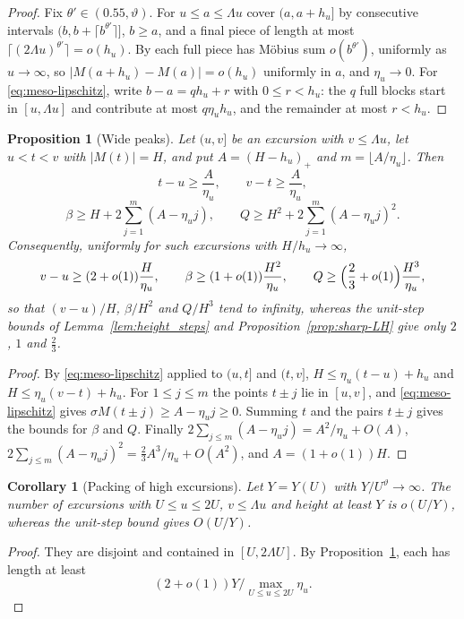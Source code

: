 \documentclass[11pt]{amsart}
\numberwithin{equation}{section}
\theoremstyle{plain}
\newtheorem{proposition}[theorem]{Proposition}
\newtheorem{corollary}[theorem]{Corollary}
\theoremstyle{definition}
\theoremstyle{remark}
\begin{document}
\begin{proof}
Fix $\theta'\in(0.55,\vartheta)$. For $u\le a\le\Lambda u$ cover $(a,a+h_u]$
by consecutive intervals $(b,b+\lceil b^{\theta'}\rceil]$, $b\ge a$, and a
final piece of length at most $\lceil(2\Lambda u)^{\theta'}\rceil=o(h_u)$.
By \cite{MatomakiTeravainen2023} each full piece has Möbius sum
$o(b^{\theta'})$, uniformly as $u\to\infty$, so
$|M(a+h_u)-M(a)|=o(h_u)$ uniformly in $a$, and $\eta_u\to0$. For
\eqref{eq:meso-lipschitz}, write $b-a=qh_u+r$ with $0\le r<h_u$: the $q$
full blocks start in $[u,\Lambda u]$ and contribute at most $q\eta_uh_u$,
and the remainder at most $r<h_u$.
\end{proof}

\begin{proposition}[Wide peaks]
\label{prop:wide-peaks}
Let $(u,v]$ be an excursion with $v\le\Lambda u$, let $u<t<v$ with
$|M(t)|=H$, and put $A=(H-h_u)_+$ and $m=\lfloor A/\eta_u\rfloor$. Then
\[
t-u\ge\frac A{\eta_u},\qquad v-t\ge\frac A{\eta_u},
\]
\[
\beta\ge H+2\sum_{j=1}^m(A-\eta_uj),\qquad
Q\ge H^2+2\sum_{j=1}^m(A-\eta_uj)^2 .
\]
Consequently, uniformly for such excursions with $H/h_u\to\infty$,
\[
v-u\ge(2+o(1))\frac H{\eta_u},\qquad
\beta\ge(1+o(1))\frac{H^2}{\eta_u},\qquad
Q\ge\Bigl(\frac23+o(1)\Bigr)\frac{H^3}{\eta_u},
\]
so that $(v-u)/H$, $\beta/H^2$ and $Q/H^3$ tend to infinity, whereas the
unit-step bounds of Lemma~\ref{lem:height_steps} and
Proposition~\ref{prop:sharp-LH} give only $2$, $1$ and $\frac23$.
\end{proposition}

\begin{proof}
By \eqref{eq:meso-lipschitz} applied to $(u,t]$ and $(t,v]$,
$H\le\eta_u(t-u)+h_u$ and $H\le\eta_u(v-t)+h_u$. For $1\le j\le m$ the
points $t\pm j$ lie in $[u,v]$, and \eqref{eq:meso-lipschitz} gives
$\sigma M(t\pm j)\ge A-\eta_uj\ge0$. Summing $t$ and the pairs $t\pm j$
gives the bounds for $\beta$ and $Q$. Finally
$2\sum_{j\le m}(A-\eta_uj)=A^2/\eta_u+O(A)$,
$2\sum_{j\le m}(A-\eta_uj)^2=\frac23A^3/\eta_u+O(A^2)$, and $A=(1+o(1))H$.
\end{proof}

\begin{corollary}[Packing of high excursions]
\label{cor:packing}
Let $Y=Y(U)$ with $Y/U^\vartheta\to\infty$. The number of excursions with
$U\le u\le2U$, $v\le\Lambda u$ and height at least $Y$ is
$o(U/Y)$, whereas the unit-step bound gives $O(U/Y)$.
\end{corollary}

\begin{proof}
They are disjoint and contained in $[U,2\Lambda U]$. By
Proposition~\ref{prop:wide-peaks}, each has length at least
$$(2+o(1))Y/\max_{U\le u\le2U}\eta_u.$$
\end{proof}
\end{document}
